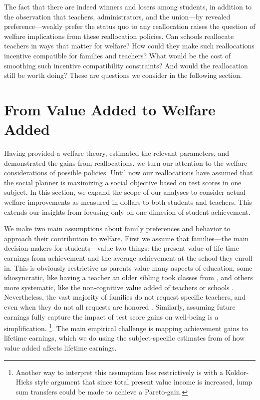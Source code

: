 \documentclass[12pt]{article}
\theoremstyle{definition}
\theoremstyle{definition}
\theoremstyle{definition}
\theoremstyle{definition}
\begin{document}
The fact that there are indeed winners and losers among students, in addition to the observation that teachers, administrators, and the union---by revealed preference---weakly prefer the status quo to any reallocation raises the question of welfare implications from these reallocation policies. Can schools reallocate teachers in ways that matter for welfare? How could they make such reallocations incentive compatible for families and teachers? What would be the cost of smoothing such incentive compatibility constraints? And would the reallocation still be worth doing? These are questions we consider in the following section.

\section{From Value Added to Welfare Added} \label{welfare}


Having provided a welfare theory, estimated the relevant parameters, and demonstrated the gains from reallocations, we turn our attention to the welfare considerations of possible policies. Until now our reallocations have assumed that the social planner is maximizing a social objective based on test scores in one subject.  In this section, we expand the scope of our analyses to consider actual welfare improvements as measured in dollars to both students and teachers. This extends our insights from focusing only on one dimesion of student achievement.

We make two main assumptions about family preferences and behavior to approach their contribution to welfare. First we assume that families---the main decision-makers for students---value two things: the present value of life time earnings from achievement and the average achievement at the school they enroll in. This is obviously restrictive as parents value many aspects of education, some idiosyncratic, like having a teacher an older sibling took classes from \citep[][]{}, and others more systematic, like the non-cognitive value added of teachers or schools \citep[][]{jackson2018test,pope2017multidimensional}. Nevertheless, the vast majority of families do not request specific teachers, and even when they do not all requests are honored .  Similarly, assuming future earnings fully capture the impact of test score gains on well-being is a simplification.%
\footnote{Another way to interpret this assumption less restrictively is with a Koldor-Hicks style argument \citep{Hicks_1940,Kaldor_1939} that since total present value income is increased, lump sum transfers could be made to achieve a Pareto-gain.}. The main empirical challenge is mapping achievement gains to lifetime earnings, which we do using the subject-specific estimates from \citet{chetty2014measuring1} of how value added affects lifetime earnings.
\end{document}
